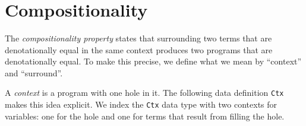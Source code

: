 \begin{fence}
\begin{code}
\<%
\\
%
\>[2]\AgdaSpace{}%
\AgdaSpace{}%
\AgdaSpace{}%
\AgdaSpace{}%
\<%
\\
\>[2][@{}l@{\AgdaIndent{0}}]%
\>[4]\AgdaSpace{}%
\AgdaSpace{}%
\AgdaSpace{}%
\AgdaSpace{}%
\<%
\\
%
\>[2]\AgdaSpace{}%
\AgdaSpace{}%
\AgdaSpace{}%
\<%
\\
\>[2][@{}l@{\AgdaIndent{0}}]%
\>[4]\AgdaSpace{}%
\AgdaSymbol{(}\AgdaSpace{}%
\AgdaSpace{}%
\AgdaSymbol{)}\<%
\\
%
\>[2]\<%
\end{code}
\end{fence}

\hypertarget{compositionality}{%
\section{Compositionality}\label{compositionality}}

The \emph{compositionality property} states that surrounding two terms
that are denotationally equal in the same context produces two programs
that are denotationally equal. To make this precise, we define what we
mean by ``context'' and ``surround''.

A \emph{context} is a program with one hole in it. The following data
definition \texttt{Ctx} makes this idea explicit. We index the
\texttt{Ctx} data type with two contexts for variables: one for the hole
and one for terms that result from filling the hole.

